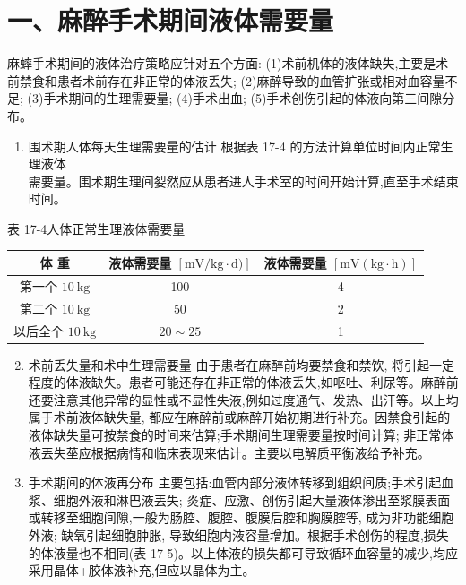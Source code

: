 \documentclass[10pt]{article}
\begin{document}
\section*{一、麻醉手术期间液体需要量}
麻蟀手术期间的液体治疗策略应针对五个方面: (1)术前机体的液体缺失,主要是术前禁食和患者术前存在非正常的体液丢失; (2)麻醉导致的血管扩张或相对血容量不足; (3)手术期间的生理需要量; (4)手术出血; (5)手术创伤引起的体液向第三间隙分布。

\begin{enumerate}
  \item 围术期人体每天生理需要量的估计 根据表 17-4 的方法计算单位时间内正常生理液体\\
需要量。围术期生理间姴然应从患者进人手术室的时间开始计算,直至手术结束时间。
\end{enumerate}

表 17-4人体正常生理液体需要量

\begin{center}
\begin{tabular}{ccc}
\hline
体 重 & 液体需要量 $[\mathrm{mV} / \mathrm{kg} \cdot \mathrm{d})]$ & 液体需要量 $[\mathrm{mV}(\mathrm{kg} \cdot \mathrm{h})]$ \\
\hline
第一个 $10 \mathrm{~kg}$ & 100 & 4 \\
第二个 $10 \mathrm{~kg}$ & 50 & 2 \\
以后全个 $10 \mathrm{~kg}$ & $20 \sim 25$ & 1 \\
\hline
\end{tabular}
\end{center}

\begin{enumerate}
  \setcounter{enumi}{1}
  \item 术前丢失量和术中生理需要量 由于患者在麻醉前均要禁食和禁饮, 将引起一定程度的体液缺失。患者可能还存在非正常的体液丢失,如呕吐、利尿等。麻醉前还要注意其他异常的显性或不显性失液,例如过度通气、发热、出汗等。以上均属于术前液体缺失量, 都应在麻醉前或麻醉开始初期进行补充。因禁食引起的液体缺失量可按禁食的时间来估算;手术期间生理需要量按时间计算; 非正常体液丟失莝应根据病情和临床表现来估计。主要以电解质平衡液给予补充。

  \item 手术期间的体液再分布 主要包括:血管内部分液体转移到组织间质;手术引起血浆、细胞外液和淋巴液丟失; 炎症、应激、创伤引起大量液体渗出至浆膜表面或转移至细胞间隙,一般为肠腔、腹腔、腹膜后腔和胸膜腔等, 成为非功能细胞外液; 缺氧引起细胞肿胀, 导致细胞内液容量增加。根据手术创伤的程度,损失的体液量也不相同(表 17-5)。以上体液的损失都可导致循环血容量的减少,均应采用晶体+胶体液补充,但应以晶体为主。

\end{enumerate}
\end{document}
